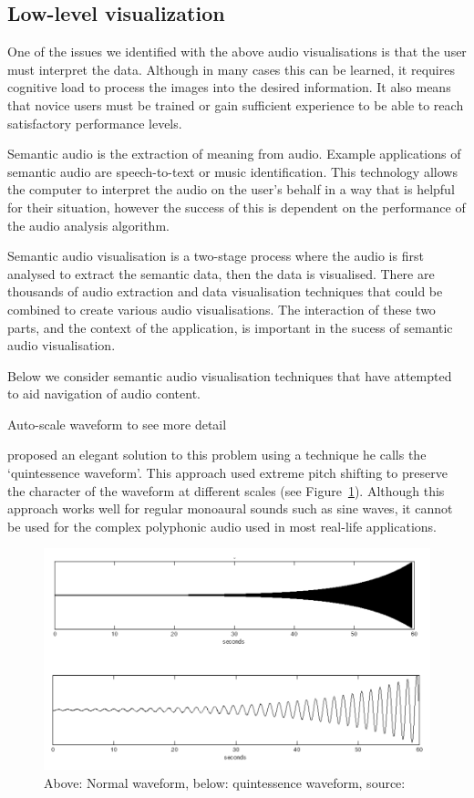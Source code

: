 \subsection{Low-level visualization}

One of the issues we identified with the above audio visualisations is that the user must interpret the data. Although
in many cases this can be learned, it requires cognitive load to process the images into the desired information. It
also means that novice users must be trained or gain sufficient experience to be able to reach satisfactory performance
levels.

Semantic audio is the extraction of meaning from audio. Example applications of semantic audio are speech-to-text or
music identification. This technology allows the computer to interpret the audio on the user's behalf in a way that is
helpful for their situation, however the success of this is dependent on the performance of the audio analysis
algorithm.

Semantic audio visualisation is a two-stage process where the audio is first analysed to extract the semantic data,
then the data is visualised. There are thousands of audio extraction and data visualisation techniques that could
be combined to create various audio visualisations. The interaction of these two parts, and the context of the
application, is important in the sucess of semantic audio visualisation. 

Below we consider semantic audio visualisation techniques that have attempted to aid navigation of audio content.

Auto-scale waveform to see more detail \citep{Goudeseune2012}

\citet{Loviscach2011}
proposed an elegant solution to this problem using a technique he calls the `quintessence waveform'. This approach
used extreme pitch shifting to preserve the character of the waveform at different scales (see Figure~\ref{fig:quint}).
Although this approach works well for regular monoaural sounds such as sine waves, it cannot be used for the complex
polyphonic audio used in most real-life applications.

\begin{figure}[p]
  \centering
  \includegraphics[width=0.95\linewidth]{figs/quint.png}
  \caption{Above: Normal waveform, below: quintessence waveform, source: \citep{Loviscach2011}}
  \label{fig:quint}
\end{figure}

